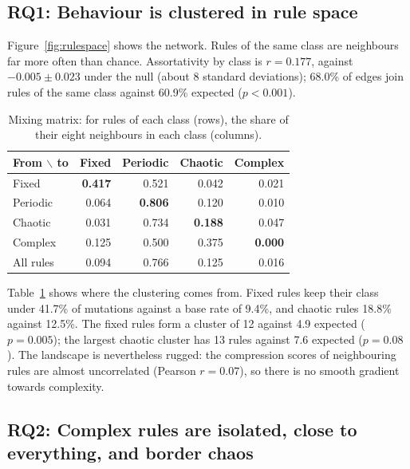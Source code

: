 \documentclass[10pt,letterpaper,twocolumn]{article}
\begin{document}
\subsection{RQ1: Behaviour is clustered in rule space}
Figure~\ref{fig:rulespace} shows the network. Rules of the same class are neighbours far more often than chance. Assortativity by class is $r = 0.177$, against $-0.005 \pm 0.023$ under the null (about 8 standard deviations); 68.0\% of edges join rules of the same class against 60.9\% expected ($p < 0.001$).

\begin{table}[t]
\caption{Mixing matrix: for rules of each class (rows), the share of their eight neighbours in each class (columns).}
\label{tab:mixing}
\centering\small
\begin{tabular}{@{}lrrrr@{}}
\toprule
From $\backslash$ to & Fixed & Periodic & Chaotic & Complex \\
\midrule
Fixed & \textbf{0.417} & 0.521 & 0.042 & 0.021 \\
Periodic & 0.064 & \textbf{0.806} & 0.120 & 0.010 \\
Chaotic & 0.031 & 0.734 & \textbf{0.188} & 0.047 \\
Complex & 0.125 & 0.500 & 0.375 & \textbf{0.000} \\
\midrule
All rules & 0.094 & 0.766 & 0.125 & 0.016 \\
\bottomrule
\end{tabular}
\end{table}

Table~\ref{tab:mixing} shows where the clustering comes from. Fixed rules keep their class under 41.7\% of mutations against a base rate of 9.4\%, and chaotic rules 18.8\% against 12.5\%. The fixed rules form a cluster of 12 against 4.9 expected ($p=0.005$); the largest chaotic cluster has 13 rules against 7.6 expected ($p=0.08$). The landscape is nevertheless rugged: the compression scores of neighbouring rules are almost uncorrelated (Pearson $r = 0.07$), so there is no smooth gradient towards complexity.

\subsection{RQ2: Complex rules are isolated, close to everything, and border chaos}
\end{document}
